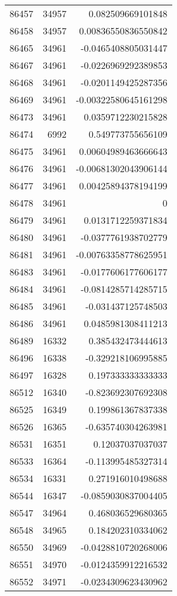 \begin{tabular}{r | r | r}
86457 & 34957 & 0.082509669101848 \\
86458 & 34957 & 0.00836550836550842 \\
86465 & 34961 & -0.0465408805031447 \\
86467 & 34961 & -0.0226969292389853 \\
86468 & 34961 & -0.0201149425287356 \\
86469 & 34961 & -0.00322580645161298 \\
86473 & 34961 & 0.0359712230215828 \\
86474 & 6992 & 0.549773755656109 \\
86475 & 34961 & 0.00604989463666643 \\
86476 & 34961 & -0.00681302043906144 \\
86477 & 34961 & 0.00425894378194199 \\
86478 & 34961 & 0 \\
86479 & 34961 & 0.0131712259371834 \\
86480 & 34961 & -0.0377761938702779 \\
86481 & 34961 & -0.00763358778625951 \\
86483 & 34961 & -0.0177606177606177 \\
86484 & 34961 & -0.0814285714285715 \\
86485 & 34961 & -0.031437125748503 \\
86486 & 34961 & 0.0485981308411213 \\
86489 & 16332 & 0.385432473444613 \\
86496 & 16338 & -0.329218106995885 \\
86497 & 16328 & 0.197333333333333 \\
86512 & 16340 & -0.823692307692308 \\
86525 & 16349 & 0.199861367837338 \\
86526 & 16365 & -0.635740304263981 \\
86531 & 16351 & 0.12037037037037 \\
86533 & 16364 & -0.113995485327314 \\
86534 & 16331 & 0.271916010498688 \\
86544 & 16347 & -0.0859030837004405 \\
86547 & 34964 & 0.468036529680365 \\
86548 & 34965 & 0.184202310334062 \\
86550 & 34969 & -0.0428810720268006 \\
86551 & 34970 & -0.0124359912216532 \\
86552 & 34971 & -0.0234309623430962 \\

\end{tabular}
